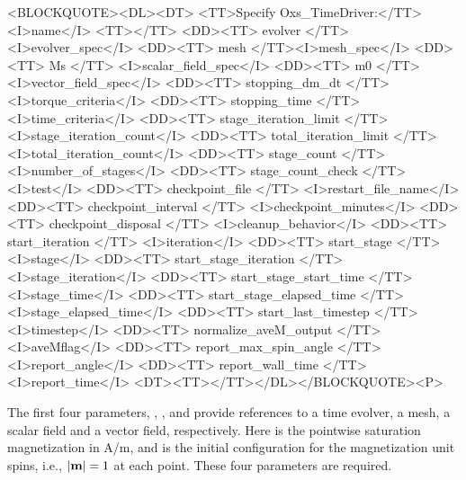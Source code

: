\begin{description}
\begin{latexonly}
\end{latexonly}
\begin{rawhtml}<BLOCKQUOTE><DL><DT>
<TT>Specify Oxs_TimeDriver:</TT><I>name</I> <TT>{</TT>
<DD><TT> evolver </TT><I>evolver_spec</I>
<DD><TT> mesh </TT><I>mesh_spec</I>
<DD><TT> Ms </TT> <I>scalar_field_spec</I>
<DD><TT> m0 </TT> <I>vector_field_spec</I>
<DD><TT> stopping_dm_dt </TT><I>torque_criteria</I>
<DD><TT> stopping_time </TT><I>time_criteria</I>
<DD><TT> stage_iteration_limit </TT><I>stage_iteration_count</I>
<DD><TT> total_iteration_limit </TT><I>total_iteration_count</I>
<DD><TT> stage_count </TT><I>number_of_stages</I>
<DD><TT> stage_count_check </TT><I>test</I>
<DD><TT> checkpoint_file </TT> <I>restart_file_name</I>
<DD><TT> checkpoint_interval </TT> <I>checkpoint_minutes</I>
<DD><TT> checkpoint_disposal </TT> <I>cleanup_behavior</I>
<DD><TT> start_iteration </TT> <I>iteration</I>
<DD><TT> start_stage </TT> <I>stage</I>
<DD><TT> start_stage_iteration </TT> <I>stage_iteration</I>
<DD><TT> start_stage_start_time </TT> <I>stage_time</I>
<DD><TT> start_stage_elapsed_time </TT> <I>stage_elapsed_time</I>
<DD><TT> start_last_timestep </TT> <I>timestep</I>
<DD><TT> normalize_aveM_output </TT> <I>aveMflag</I>
<DD><TT> report_max_spin_angle </TT> <I>report_angle</I>
<DD><TT> report_wall_time </TT> <I>report_time</I>
<DT><TT>}</TT></DL></BLOCKQUOTE><P>
\end{rawhtml}
The first four parameters, , ,
 and  provide references to a time evolver, a
mesh, a scalar field and a vector field, respectively.  Here  is
the pointwise saturation magnetization in A/m, and  is the
initial configuration for the magnetization unit spins, i.e., $|\textbf{m}|=1$
at each point.  These four parameters are required.


\end{description}
